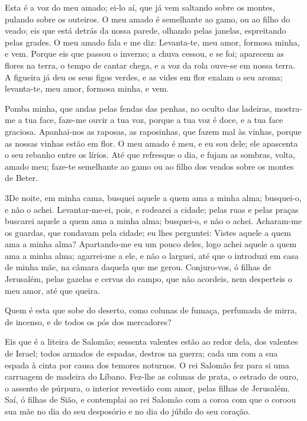 Esta é a voz do meu amado; ei-lo aí, que já vem saltando sobre os
montes, pulando sobre os outeiros. O meu amado é semelhante ao
gamo, ou ao filho do veado; eis que está detrás da nossa parede,
olhando pelas janelas, espreitando pelas grades. O meu amado
fala e me diz: Levanta-te, meu amor, formosa minha, e vem.
Porque eis que passou o inverno; a chuva cessou, e se foi;
aparecem as flores na terra, o tempo de cantar chega, e a voz
da rola ouve-se em nossa terra. A figueira já deu os seus
figos verdes, e as vides em flor exalam o seu aroma; levanta-te, meu
amor, formosa minha, e vem.

Pomba minha, que andas pelas fendas das penhas, no oculto das
ladeiras, mostra-me a tua face, faze-me ouvir a tua voz, porque a
tua voz é doce, e a tua face graciosa. Apanhai-nos as
raposas, as raposinhas, que fazem mal às vinhas, porque as nossas
vinhas estão em flor. O meu amado é meu, e eu sou dele; ele
apascenta o seu rebanho entre os lírios. Até que refresque o
dia, e fujam as sombras, volta, amado meu; faze-te semelhante ao
gamo ou ao filho dos veados sobre os montes de Beter.

\medskip

\lettrine{3} De noite, em minha cama, busquei aquele a quem
ama a minha alma; busquei-o, e não o achei. Levantar-me-ei,
pois, e rodearei a cidade; pelas ruas e pelas praças buscarei aquele
a quem ama a minha alma; busquei-o, e não o achei. Acharam-me os
guardas, que rondavam pela cidade; eu lhes perguntei: Vistes aquele
a quem ama a minha alma? Apartando-me eu um pouco deles, logo
achei aquele a quem ama a minha alma; agarrei-me a ele, e não o
larguei, até que o introduzi em casa de minha mãe, na câmara daquela
que me gerou. Conjuro-vos, ó filhas de Jerusalém, pelas gazelas
e cervas do campo, que não acordeis, nem desperteis o meu amor, até
que queira.

Quem é esta que sobe do deserto, como colunas de fumaça, perfumada
de mirra, de incenso, e de todos os pós dos mercadores?

Eis que é a liteira de Salomão; sessenta valentes estão ao redor
dela, dos valentes de Israel; todos armados de espadas, destros
na guerra; cada um com a sua espada à cinta por causa dos temores
noturnos. O rei Salomão fez para si uma carruagem de madeira do
Líbano. Fez-lhe as colunas de prata, o estrado de ouro, o
assento de púrpura, o interior revestido com amor, pelas filhas de
Jerusalém. Saí, ó filhas de Sião, e contemplai ao rei Salomão
com a coroa com que o coroou sua mãe no dia do seu desposório e no
dia do júbilo do seu coração.

